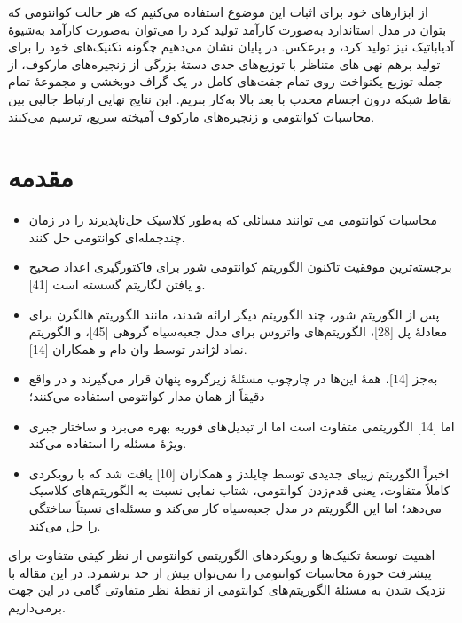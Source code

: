 از ابزارهای خود برای اثبات این موضوع استفاده می‌کنیم که هر حالت کوانتومی که بتوان در مدل استاندارد به‌صورت کارآمد تولید کرد را می‌توان به‌صورت کارآمد به‌شیوهٔ آدیاباتیک نیز تولید کرد، و برعکس. در پایان نشان می‌دهیم چگونه تکنیک‌های خود را برای تولید برهم نهی ‌های متناظر با توزیع‌های حدی دستهٔ بزرگی از زنجیره‌های مارکوف، از جمله توزیع یکنواخت روی تمام جفت‌های کامل در یک گراف دوبخشی و مجموعهٔ تمام نقاط شبکه درون اجسام محدب با بعد بالا به‌کار ببریم. این نتایج نهایی ارتباط جالبی بین محاسبات کوانتومی و زنجیره‌های مارکوف آمیخته سریع، ترسیم می‌کنند.

\section{ مقدمه}
\begin{itemize}
	\item 
	محاسبات کوانتومی می توانند مسائلی که به‌طور کلاسیک حل‌ناپذیرند را در زمان چندجمله‌ای کوانتومی حل کنند. 
	\item
	برجسته‌ترین موفقیت تاکنون الگوریتم کوانتومی شور برای فاکتورگیری اعداد صحیح و یافتن لگاریتم گسسته است [41]. 
	\item
	پس از الگوریتم شور، چند الگوریتم دیگر ارائه شدند، مانند الگوریتم هالگرن برای معادلهٔ پل [28]، الگوریتم‌های واتروس برای مدل جعبه‌سیاه گروهی [45]، و الگوریتم نماد لژاندر توسط وان دام و همکاران [14]. 
	\item
	به‌جز [14]، همهٔ این‌ها در چارچوب مسئلهٔ زیرگروه پنهان قرار می‌گیرند و در واقع دقیقاً از همان مدار کوانتومی استفاده می‌کنند؛ 
	\item
	اما [14] الگوریتمی متفاوت است اما از تبدیل‌های فوریه بهره می‌برد و ساختار جبری ویژهٔ مسئله را استفاده می‌کند. 
	\item
	اخیراً الگوریتم زیبای جدیدی توسط چایلدز و همکاران [10] یافت شد که با رویکردی کاملاً متفاوت، یعنی قدم‌زدن کوانتومی، شتاب نمایی نسبت به الگوریتم‌های کلاسیک می‌دهد؛ اما این الگوریتم در مدل جعبه‌سیاه کار می‌کند و مسئله‌ای نسبتاً ساختگی را حل می‌کند.
\end{itemize}


اهمیت توسعهٔ تکنیک‌ها و رویکردهای الگوریتمی کوانتومی از نظر کیفی متفاوت برای پیشرفت حوزهٔ محاسبات کوانتومی را نمی‌توان بیش از حد برشمرد. در این مقاله با نزدیک شدن به مسئلهٔ الگوریتم‌های کوانتومی از نقطهٔ نظر متفاوتی گامی در این جهت برمی‌داریم.
